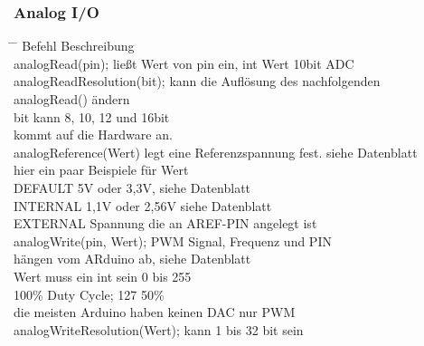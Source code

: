 \documentclass[10pt,a4paper,oneside]{article}
\begin{document}
\subsubsection{Analog I/O}
\begin{tabbing}
  \hspace*{1mm} \=\hspace{52mm} \= \kill
  \>Befehl \>Beschreibung \\
  \>analogRead(pin); \> ließt Wert von pin ein, int Wert 10bit ADC \\
  \>analogReadResolution(bit); \> kann die Auflösung des nachfolgenden \\ 
  \> \> analogRead() ändern\\
  \> \> bit kann 8, 10, 12 und 16bit\\ 
  \> \> kommt auf die Hardware an.\\
  \>analogReference(Wert) \> legt eine Referenzspannung fest. siehe Datenblatt\\
  \> \> hier ein paar Beispiele für Wert\\ 
  \> \> DEFAULT 5V oder 3,3V, siehe Datenblatt \\ 
  \> \> INTERNAL 1,1V oder 2,56V siehe Datenblatt\\ 
  \> \> EXTERNAL Spannung die an AREF-PIN angelegt ist\\
  \>analogWrite(pin, Wert); \> PWM Signal, Frequenz und PIN\\ 
  \> \> hängen vom ARduino ab, siehe Datenblatt\\ 
  \> \> Wert muss ein int sein 0 bis 255\\ 
  \>  100\% Duty Cycle; 127 50\% \\ 
  \> \> die meisten Arduino haben keinen DAC nur PWM\\
  \> analogWriteResolution(Wert); \> kann 1 bis 32 bit sein\\ 
\end{tabbing}
\end{document}
